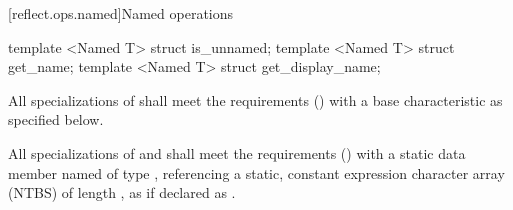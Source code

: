 [reflect.ops.named]{Named operations}

\begin{std.txt}\color{addclr}

\begin{itemdecl}
template <Named T> struct is_unnamed;
template <Named T> struct get_name;
template <Named T> struct get_display_name;
\end{itemdecl}

\begin{itemdescr}
\pnum
All specializations of  shall meet the  requirements () with a base characteristic as specified below.

\pnum
All specializations of  and  shall meet the  requirements () with a static data member named  of type , referencing a static, constant expression character array (NTBS) of length , as if declared as .


\end{itemdescr}
\end{std.txt}
